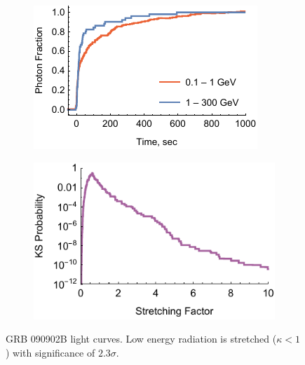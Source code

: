 \documentclass[manuscript]{aastex}
\begin{document}
\begin{figure}
        \centering
        \begin{subfigure}{0.49\textwidth}
                \includegraphics[width=\textwidth]{lightCurve090902B}
                \label{fig:lightCurve090902B}
        \end{subfigure}
        \begin{subfigure}{0.49\textwidth}
                \includegraphics[width=\textwidth]{probabilities090902B}
                \label{fig:probabilities090902B}
        \end{subfigure}
        \caption{GRB 090902B light curves. Low energy radiation is stretched ($\kappa < 1$) with significance of $2.3\sigma$.}
        \label{fig:grb090902B}
\end{figure}
\end{document}
